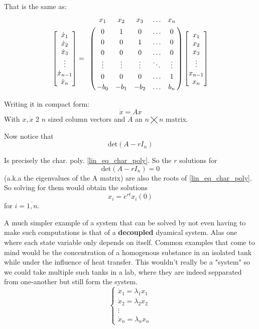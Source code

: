 That is the same as:
\begin{align*}
				\begin{bmatrix}
								\dot{x}_1     \\
								\dot{x}_2     \\
								\dot{x}_3     \\
								\vdots        \\
								\dot{x}_{n-1} \\
								\dot{x}_n
				\end{bmatrix} =
				\bordermatrix{ & x_1    & x_2    & x_3    & \ldots & x_n \cr
								& 0      & 1      & 0      & \ldots & 0 \cr
								& 0      & 0      & 1      & \ldots & 0 \cr
								& 0      & 0      & 0      & \ldots & 0 \cr
								& \vdots & \vdots & \vdots & \ddots & \vdots \cr
								& 0      & 0      & 0      & \ldots & 1 \cr
				& -b_0   & -b_1   & -b_2   & \ldots & b_n }
				\begin{bmatrix}
								x_1     \\
								x_2     \\
								x_3     \\
								\vdots  \\
								x_{n-1} \\
								x_n
				\end{bmatrix}
\end{align*}

Writing it in compact form:
\[
				\dot{x} = A x
\]
With $x, \dot{x}$ 2 $n$ sized column vectors and $A$ an $n \bigtimes n$ matrix.

Now notice that
\[
				\text{det}(A- r I_n)
\]

Is precisely the char. poly. \ref{lin_eq_char_poly}. So the $r$ solutions for
\[
				\text{det}(A - r I_n) =0
\]
(a.k.a the eigenvalues of the A matrix) are also the roots of \ref{lin_eq_char_poly}. So solving for them would obtain the solutions
\[
				x_i = e^{rt}x_i(0)
\]
for $i = \overline{1,n}$.

A much simpler example of a system that can be solved by not even having to make such computations is that of a \textbf{decoupled} dyamical system. Alas one where each state variable only depends on itself. Common examples that come to mind would be the concentration of a homogenous substance in an isolated tank while under the influence of heat transfer. This wouldn't really be a "system" so we could take multiple such tanks in a lab, where they are indeed sepparated from one-another but still form the system.
\begin{equation*}
				\begin{cases}
								\dot{x}_1 = \lambda_1 x_1 \\
								\dot{x}_2 = \lambda_2 x_2 \\
								\vdots \\
								\dot{x}_n = \lambda_n x_n
				\end{cases}
\end{equation*}

